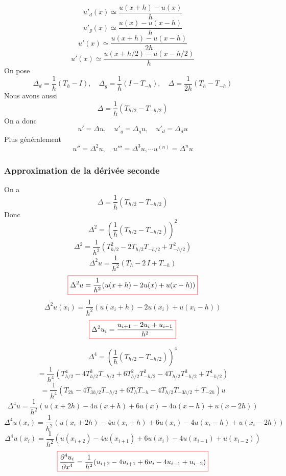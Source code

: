 \documentclass{beamer}
\newcommand{\myredbox}[1]{\fcolorbox{red}{white}{$\displaystyle#1$}}
\begin{document}
\begin{frame}
\[u'_d(x)\simeq  \frac{u(x+h)-u(x)}{h}\]
\[u'_g(x)\simeq  \frac{u(x)-u(x-h)}{h}\]
\[u'(x)\simeq  \frac{u(x+h)-u(x-h)}{2h}\]
\[u'(x)\simeq  \frac{u(x+h/2)-u(x-h/2)}{h}\]
On pose \[\Delta_d =\frac 1h(T_{h}-I),\quad \Delta_g =\frac 1h(I-T_{-h}),\quad \Delta =\frac 1{2h}(T_{h}-T_{-h})\]
Nous avons aussi
\[\Delta =\frac 1{h}(T_{h/2}-T_{-h/2})\]
On a donc \[u'=\Delta u, \quad u'_g=\Delta_g u, \quad u'_d=\Delta_d u\]
Plus généralement
\[u'' =\Delta^2u,\quad u''' =\Delta^3u,\cdots u^{(n)}=\Delta^nu\]
\end{frame}

\begin{frame}
\frametitle{Approximation de la dérivée seconde}
On a
\[\Delta =\frac 1h(T_{h/2}-T_{-h/2})\]
Donc
\[\Delta^2=\left(\frac 1h(T_{h/2}-T_{-h/2})\right)^2\]
\[\Delta^2=\frac 1{h^2}(T_{h/2}^2-2T_{h/2}T_{-h/2} +T_{-h/2}^2)\]
\[\Delta^2u=\frac 1{h^2}(T_h-2\,I+T_{-h})\]
\[\myredbox{\Delta^2u=\frac 1{h^2}(u(x+h)-2u(x)+u(x-h))}\]
\[\Delta^2u(x_i)=\frac 1{h^2}(u(x_i+h)-2u(x_i)+u(x_i-h))\]
\[\myredbox{\Delta^2u_i=\frac {u_{i+1}-2u_i+u_{i-1}}{h^2}}\]

\end{frame}
\begin{frame}

\[\Delta^4=\left(\frac 1h(T_{h/2}-T_{-h/2})\right)^4\]\[=\frac 1{h^4}(T^4_{h/2}-4T^3_{h/2}T_{-h/2}+6T^2_{h/2}T^2_{-h/2}-4T_{h/2}T^3_{-h/2}+T^4_{-h/2})\]
\[=\frac 1{h^4}(T_{2h}-4T_{3h/2}T_{-h/2}+6T_{h}T_{-h}-4T_{h/2}T_{-3h/2}+T_{-2h})u\]
\[\Delta^4u=\frac 1{h^2}(u(x+2h)-4u(x+h)+6u(x)-4u(x-h)+u(x-2h))\]
\[\Delta^4u(x_i)=\frac 1{h^2}(u(x_i+2h)-4u(x_i+h)+6u(x_i)-4u(x_i-h)+u(x_i-2h))\]
\[\Delta^4u(x_i)=\frac 1{h^2}(u(x_{i+2})-4u(x_{i+1})+6u(x_i)-4u(x_{i-1})+u(x_{i-2}))\]
\[\myredbox{\frac{\partial^4 u_i}{\partial x^4}=\frac 1{h^2}(u_{i+2}-4u_{i+1}+6u_i-4u_{i-1}+u_{i-2})}\]

\end{frame}
\end{document}
